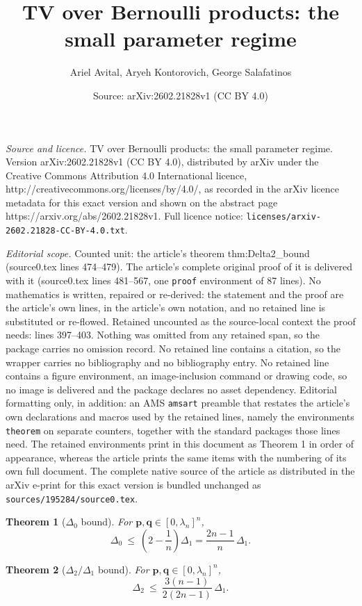 \documentclass[10pt,a4paper]{amsart}
\title{TV over Bernoulli products: the small parameter regime}
\author{Ariel Avital, Aryeh Kontorovich, George Salafatinos}
\date{Source: arXiv:2602.21828v1 (CC BY 4.0)}
\newtheorem{theorem}{Theorem}
\newcommand{\lam}{\lambda}
\newcommand{\pvec}{\vct{p}}
\newcommand{\qvec}{\vct{q}}
\newcommand{\vct}[1]{\mathbf{#1}}
\begin{document}
\maketitle

\noindent\emph{Source and licence.} TV over Bernoulli products: the small parameter regime. Version arXiv:2602.21828v1 (CC BY 4.0), distributed by arXiv under the Creative Commons Attribution 4.0 International licence, http://creativecommons.org/licenses/by/4.0/, as recorded in the arXiv licence metadata for this exact version and shown on the abstract page https://arxiv.org/abs/2602.21828v1. Full licence notice: \texttt{licenses/arxiv-2602.21828-CC-BY-4.0.txt}.\par\smallskip

\noindent\textit{Editorial scope.} Counted unit: the article's theorem thm:Delta2\_bound (source0.tex lines 474--479). The article's complete original proof of it is delivered with it (source0.tex lines 481--567, one \texttt{proof} environment of 87 lines). No mathematics is written, repaired or re-derived: the statement and the proof are the article's own lines, in the article's own notation, and no retained line is substituted or re-flowed.  Retained uncounted as the source-local context the proof needs: lines 397--403.  Nothing was omitted from any retained span, so the package carries no omission record.  No retained line contains a citation, so the wrapper carries no bibliography and no bibliography entry.  No retained line contains a figure environment, an image-inclusion command or drawing code, so no image is delivered and the package declares no asset dependency.  Editorial formatting only, in addition: an AMS \texttt{amsart} preamble that restates the article's own declarations and macros used by the retained lines, namely the environments \texttt{theorem} on separate counters, together with the standard packages those lines need.  The retained environments print in this document as Theorem 1 in order of appearance, whereas the article prints the same items with the numbering of its own full document.  The complete native source of the article as distributed in the arXiv e-print for this exact version is bundled unchanged as \texttt{sources/195284/source0.tex}.
\begin{theorem}[$\Delta_0$ bound]\label{thm:Delta0_bound}
For $\pvec,\qvec\in[0,\lam_n]^n$,
\[
\Delta_0\ \le\ \left(2-\frac1n\right)\Delta_1
=\frac{2n-1}{n}\,\Delta_1.
\]
\end{theorem}

\begin{theorem}[$\Delta_2/\Delta_1$ bound]\label{thm:Delta2_bound}
For $\pvec,\qvec\in[0,\lam_n]^n$,
\[
\Delta_2\ \le\ \frac{3(n-1)}{2(2n-1)}\,\Delta_1.
\]
\end{theorem}
\end{document}
